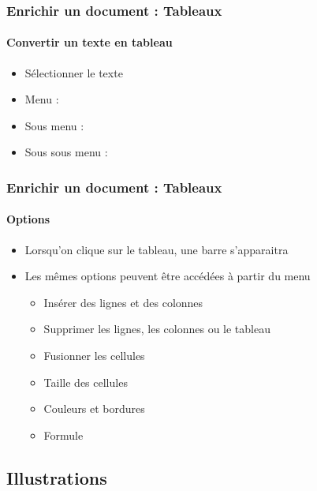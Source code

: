 \documentclass[xcolor=table]{beamer}
\begin{document}
\begin{frame}
\frametitle{Enrichir un document : Tableaux}
\framesubtitle{Convertir un texte en tableau}

\begin{minipage}{0.59\textwidth}
	\begin{itemize}
		\item Sélectionner le texte
		\item Menu : 
		\item Sous menu : 
		\item Sous sous menu : 
	\end{itemize}
\end{minipage}
\begin{minipage}{0.40\textwidth}	
\end{minipage}

\end{frame}

\begin{frame}[t]
\frametitle{Enrichir un document : Tableaux}
\framesubtitle{Options}


\begin{itemize}
	\item Lorsqu'on clique sur le tableau, une barre s'apparaitra
	\item Les mêmes options peuvent être accédées à partir du menu 
	\begin{itemize}
		\item Insérer des lignes et des colonnes
		\item Supprimer les lignes, les colonnes ou le tableau
		\item Fusionner les cellules
		\item Taille des cellules
		\item Couleurs et bordures
		\item Formule
	\end{itemize}
\end{itemize}

\end{frame}

\subsection{Illustrations}
\end{document}
